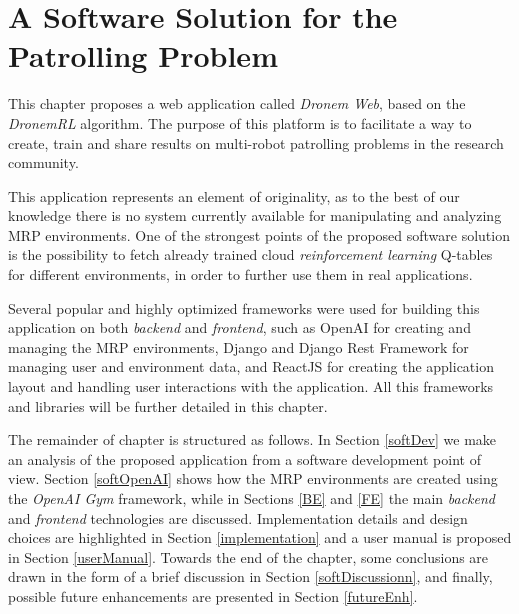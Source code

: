 \chapter{A Software Solution for the Patrolling Problem}
\label{softwareApplication}

This chapter proposes a web application called \emph{Dronem Web}, based on the \emph{DronemRL} algorithm. The purpose of this platform is to facilitate a way to create, train and share results on multi-robot patrolling problems in the research community. 

\par This application represents an element of originality, as to the best of our knowledge there is no system currently available for manipulating and analyzing MRP environments. One of the strongest points of the proposed software solution is the possibility to fetch already trained cloud \emph{reinforcement learning} Q-tables for different environments, in order to further use them in real applications. 

\par Several popular and highly optimized frameworks were used for building this application on both \emph{backend} and \emph{frontend}, such as OpenAI for creating and managing the MRP environments, Django and Django Rest Framework for managing user and environment data, and ReactJS for creating the application layout and handling user interactions with the application. All this frameworks and libraries will be further detailed in this chapter. 

\par The remainder of chapter is structured as follows. In Section \ref{softDev} we make an analysis of the proposed application from a software development point of view. Section \ref{softOpenAI} shows how the MRP environments are created using the \emph{OpenAI Gym} \cite{brockman2016openai} framework, while in Sections \ref{BE} and \ref{FE} the main \emph{backend} and \emph{frontend} technologies are discussed. Implementation details and design choices are highlighted in Section \ref{implementation} and a user manual is proposed in Section \ref{userManual}. Towards the end of the chapter, some conclusions are drawn in the form of a brief discussion in Section \ref{softDiscussionn}, and finally, possible future enhancements are presented in Section \ref{futureEnh}.
 
\newpage
